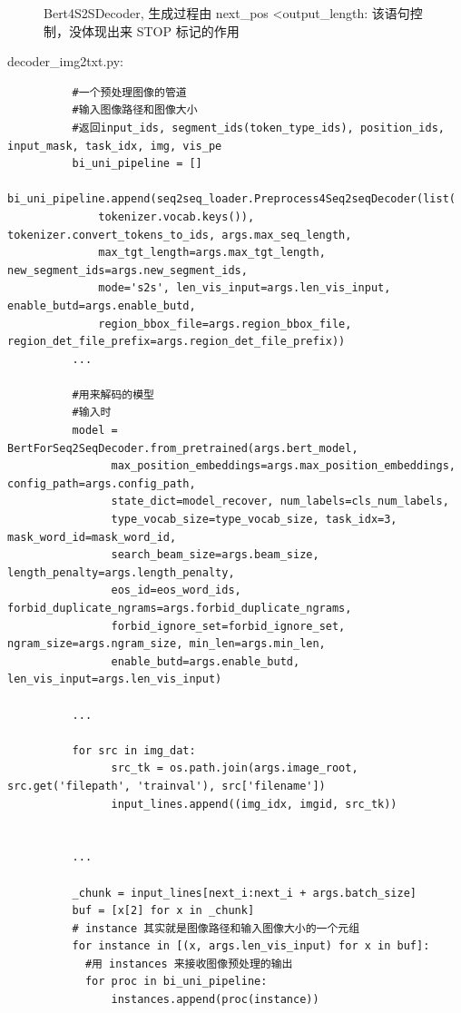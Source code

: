 \documentclass[a4paper]{article}
\begin{document}
\begin{sloppypar}
\begin{figure}[H]
        \caption{Bert4S2SDecoder, 生成过程由 next\_pos \textless output\_length: 该语句控制，没体现出来 STOP 标记的作用}

        \label{Bert4S2SDecoder}
    \end{figure}


    \newpage
    decoder\_img2txt.py:
    \begin{lstlisting}
          #一个预处理图像的管道
          #输入图像路径和图像大小
          #返回input_ids, segment_ids(token_type_ids), position_ids, input_mask, task_idx, img, vis_pe
          bi_uni_pipeline = []
          bi_uni_pipeline.append(seq2seq_loader.Preprocess4Seq2seqDecoder(list(
              tokenizer.vocab.keys()), tokenizer.convert_tokens_to_ids, args.max_seq_length,
              max_tgt_length=args.max_tgt_length, new_segment_ids=args.new_segment_ids,
              mode='s2s', len_vis_input=args.len_vis_input, enable_butd=args.enable_butd,
              region_bbox_file=args.region_bbox_file, region_det_file_prefix=args.region_det_file_prefix))
          ...

          #用来解码的模型
          #输入时
          model = BertForSeq2SeqDecoder.from_pretrained(args.bert_model,
                max_position_embeddings=args.max_position_embeddings, config_path=args.config_path,
                state_dict=model_recover, num_labels=cls_num_labels,
                type_vocab_size=type_vocab_size, task_idx=3, mask_word_id=mask_word_id,
                search_beam_size=args.beam_size, length_penalty=args.length_penalty,
                eos_id=eos_word_ids, forbid_duplicate_ngrams=args.forbid_duplicate_ngrams,
                forbid_ignore_set=forbid_ignore_set, ngram_size=args.ngram_size, min_len=args.min_len,
                enable_butd=args.enable_butd, len_vis_input=args.len_vis_input)

          ...

          for src in img_dat:
                src_tk = os.path.join(args.image_root, src.get('filepath', 'trainval'), src['filename'])
                input_lines.append((img_idx, imgid, src_tk))


          ...

          _chunk = input_lines[next_i:next_i + args.batch_size]
          buf = [x[2] for x in _chunk]
          # instance 其实就是图像路径和输入图像大小的一个元组
          for instance in [(x, args.len_vis_input) for x in buf]:
            #用 instances 来接收图像预处理的输出
            for proc in bi_uni_pipeline:
                instances.append(proc(instance))


\end{lstlisting}
\end{sloppypar}
\end{document}
